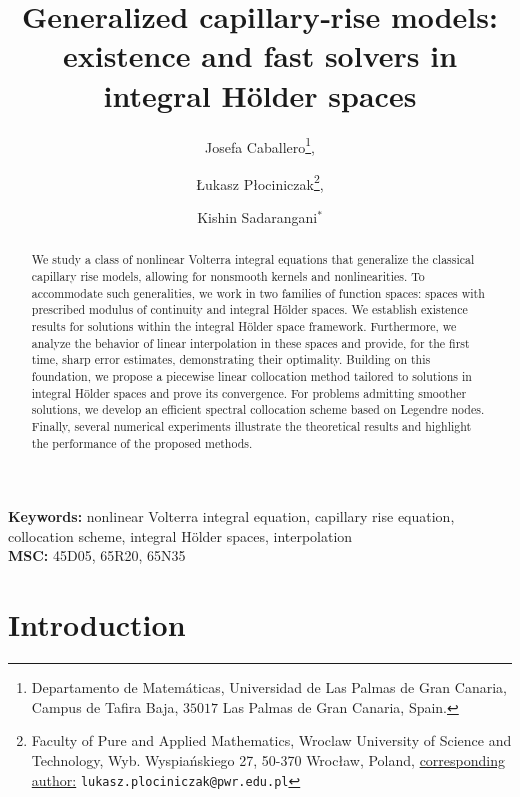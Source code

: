 \documentclass[12pt,a4paper]{article}
\title{Generalized capillary‐rise models: existence and fast solvers in integral H\"older spaces}
\author{
Josefa Caballero\thanks{Departamento de Matem\'aticas, Universidad de Las Palmas de Gran Canaria, Campus de Tafira Baja, $35017$ Las Palmas de Gran Canaria, Spain.}, \and 
{\L}ukasz P{\l}ociniczak\thanks{Faculty of Pure and Applied Mathematics, Wroclaw University of Science and Technology, Wyb. Wyspia\'nskiego 27, 50-370 Wroc{\l}aw, Poland, \underline{corresponding author:} \texttt{lukasz.plociniczak@pwr.edu.pl}}, \vspace{4pt}\and
Kishin  Sadarangani$^*$
}
\date{}
\begin{document}
\maketitle

\begin{abstract}
	We study a class of nonlinear Volterra integral equations that generalize the classical capillary rise models, allowing for nonsmooth kernels and nonlinearities. To accommodate such generalities, we work in two families of function spaces: spaces with prescribed modulus of continuity and integral H\"older spaces. We establish existence results for solutions within the integral H\"older space framework. Furthermore, we analyze the behavior of linear interpolation in these spaces and provide, for the first time, sharp error estimates, demonstrating their optimality. Building on this foundation, we propose a piecewise linear collocation method tailored to solutions in integral H\"older spaces and prove its convergence. For problems admitting smoother solutions, we develop an efficient spectral collocation scheme based on Legendre nodes. Finally, several numerical experiments illustrate the theoretical results and highlight the performance of the proposed methods.
\end{abstract}

\textbf{Keywords:} nonlinear Volterra integral equation, capillary rise equation, collocation scheme, integral H\"older spaces, interpolation\\

\textbf{MSC:} 45D05, 65R20, 65N35

\section{Introduction}
\end{document}
